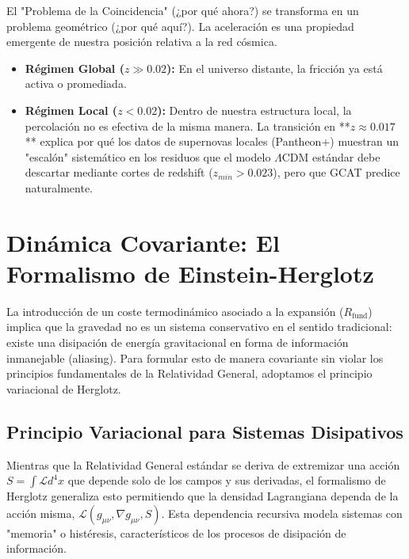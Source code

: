 \documentclass[12pt, a4paper]{article}
\theoremstyle{plain}
\theoremstyle{definition}
\begin{document}
El "Problema de la Coincidencia" (¿por qué ahora?) se transforma en un problema geométrico (¿por qué aquí?). La aceleración es una propiedad emergente de nuestra posición relativa a la red cósmica.

\begin{itemize}
    \item \textbf{Régimen Global ($z \gg 0.02$):} En el universo distante, la fricción ya está activa o promediada.
    \item \textbf{Régimen Local ($z < 0.02$):} Dentro de nuestra estructura local, la percolación no es efectiva de la misma manera. La transición en **$z \approx 0.017$** explica por qué los datos de supernovas locales (Pantheon+) muestran un "escalón" sistemático en los residuos que el modelo $\Lambda$CDM estándar debe descartar mediante cortes de redshift ($z_{min} > 0.023$), pero que GCAT predice naturalmente.
\end{itemize}

\section{Dinámica Covariante: El Formalismo de Einstein-Herglotz}
\label{sec:dinamica}

La introducción de un coste termodinámico asociado a la expansión ($R_{\text{fund}}$) implica que la gravedad no es un sistema conservativo en el sentido tradicional: existe una disipación de energía gravitacional en forma de información inmanejable (aliasing). Para formular esto de manera covariante sin violar los principios fundamentales de la Relatividad General, adoptamos el principio variacional de Herglotz.

\subsection{Principio Variacional para Sistemas Disipativos}

Mientras que la Relatividad General estándar se deriva de extremizar una acción $S = \int \mathcal{L} d^4x$ que depende solo de los campos y sus derivadas, el formalismo de Herglotz generaliza esto permitiendo que la densidad Lagrangiana dependa de la acción misma, $\mathcal{L}(g_{\mu\nu}, \nabla g_{\mu\nu}, S)$. Esta dependencia recursiva modela sistemas con "memoria" o histéresis, característicos de los procesos de disipación de información.
\end{document}
